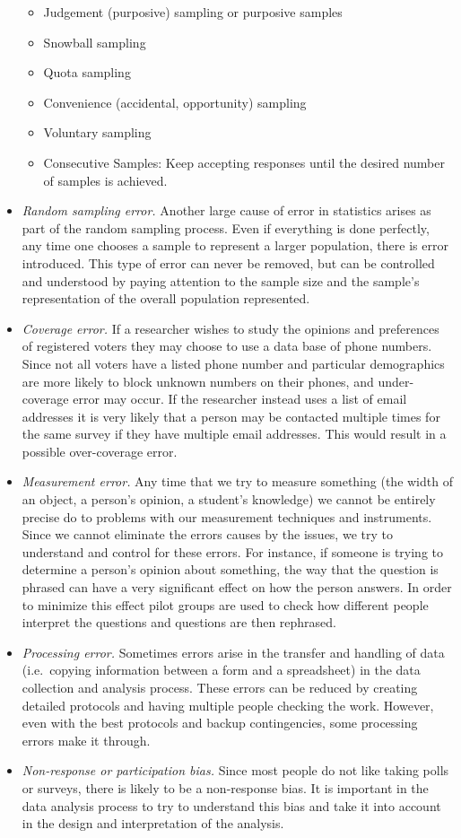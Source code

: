 \documentclass[
]{book}
\providecommand{\tightlist}{%
  \setlength{\itemsep}{0pt}\setlength{\parskip}{0pt}}
\theoremstyle{definition}
\theoremstyle{definition}
\theoremstyle{definition}
\theoremstyle{definition}
\theoremstyle{remark}
\begin{document}
\begin{itemize}
  \begin{itemize}
  \tightlist
  \item
    Judgement (purposive) sampling or purposive samples
  \item
    Snowball sampling
  \item
    Quota sampling
  \item
    Convenience (accidental, opportunity) sampling
  \item
    Voluntary sampling
  \item
    Consecutive Samples: Keep accepting responses until the desired number of samples is achieved.
  \end{itemize}
\item
  \emph{Random sampling error.} Another large cause of error in statistics arises as part of the random sampling process. Even if everything is done perfectly, any time one chooses a sample to represent a larger population, there is error introduced. This type of error can never be removed, but can be controlled and understood by paying attention to the sample size and the sample's representation of the overall population represented.
\item
  \emph{Coverage error.} If a researcher wishes to study the opinions and preferences of registered voters they may choose to use a data base of phone numbers. Since not all voters have a listed phone number and particular demographics are more likely to block unknown numbers on their phones, and under-coverage error may occur. If the researcher instead uses a list of email addresses it is very likely that a person may be contacted multiple times for the same survey if they have multiple email addresses. This would result in a possible over-coverage error.
\item
  \emph{Measurement error.} Any time that we try to measure something (the width of an object, a person's opinion, a student's knowledge) we cannot be entirely precise do to problems with our measurement techniques and instruments. Since we cannot eliminate the errors causes by the issues, we try to understand and control for these errors. For instance, if someone is trying to determine a person's opinion about something, the way that the question is phrased can have a very significant effect on how the person answers. In order to minimize this effect pilot groups are used to check how different people interpret the questions and questions are then rephrased.
\item
  \emph{Processing error.} Sometimes errors arise in the transfer and handling of data (i.e.~copying information between a form and a spreadsheet) in the data collection and analysis process. These errors can be reduced by creating detailed protocols and having multiple people checking the work. However, even with the best protocols and backup contingencies, some processing errors make it through.
\item
  \emph{Non-response or participation bias.} Since most people do not like taking polls or surveys, there is likely to be a non-response bias. It is important in the data analysis process to try to understand this bias and take it into account in the design and interpretation of the analysis.
\end{itemize}
\end{document}
